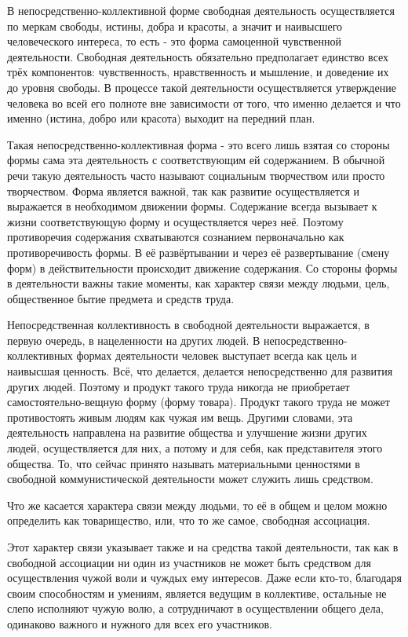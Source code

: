 \documentclass[12pt,a4paper,openany]{book}
\begin{document}
В непосредственно-коллективной форме свободная деятельность осуществляется по меркам свободы, истины, добра и красоты, а значит и наивысшего человеческого интереса, то есть - это форма самоценной чувственной деятельности. Свободная деятельность обязательно предполагает единство всех трёх компонентов: чувственность, нравственность и мышление, и доведение их до уровня свободы. В процессе такой деятельности осуществляется утверждение человека во всей его полноте вне зависимости от того, что именно делается и что именно (истина, добро или красота) выходит на передний план.

Такая непосредственно-коллективная форма - это всего лишь взятая со стороны формы сама эта деятельность с соответствующим ей содержанием. В обычной речи такую деятельность часто называют социальным творчеством или просто творчеством. Форма является важной, так как развитие осуществляется и выражается в необходимом движении формы. Содержание всегда вызывает к жизни соответствующую форму и осуществляется через неё. Поэтому противоречия содержания схватываются сознанием первоначально как противоречивость формы. В её развёртывании и через её развертывание (смену форм) в действительности происходит движение содержания. Со стороны формы в деятельности важны такие моменты, как характер связи между людьми, цель, общественное бытие предмета и средств труда.

Непосредственная коллективность в свободной деятельности выражается, в первую очередь, в нацеленности на других людей. В непосредственно-коллективных формах деятельности человек выступает всегда как цель и наивысшая ценность. Всё, что делается, делается непосредственно для развития других людей. Поэтому и продукт такого труда никогда не приобретает самостоятельно-вещную форму (форму товара). Продукт такого труда не может противостоять живым людям как чужая им вещь. Другими словами, эта деятельность направлена на развитие общества и улучшение жизни других людей, осуществляется для них, а потому и для себя, как представителя этого общества. То, что сейчас принято называть материальными ценностями в свободной коммунистической деятельности может служить лишь средством.

Что же касается характера связи между людьми, то её в общем и целом можно определить как товарищество, или, что то же самое, свободная ассоциация.

Этот характер связи указывает также и на средства такой деятельности, так как в свободной ассоциации ни один из участников не может быть средством для осуществления чужой воли и чуждых ему интересов. Даже если кто-то, благодаря своим способностям и умениям, является ведущим в коллективе, остальные не слепо исполняют чужую волю, а сотрудничают в осуществлении общего дела, одинаково важного и нужного для всех его участников.
\end{document}
